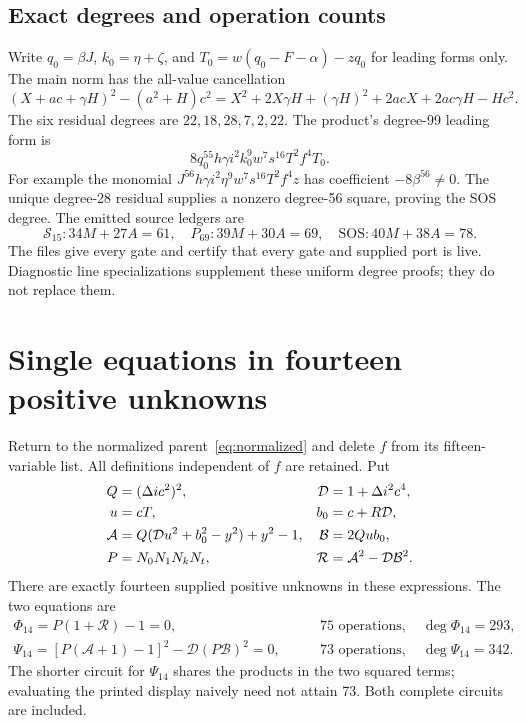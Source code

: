 \documentclass[11pt,a4paper]{article}
\theoremstyle{remark}\newtheorem{remark}[theorem]{Remark}
\newcommand{\RR}{\mathcal R}
\newcommand{\Arat}{\mathcal A}
\newcommand{\Brat}{\mathcal B}
\newcommand{\Drat}{\mathcal D}
\begin{document}
\subsection{Exact degrees and operation counts}
Write \(q_0=\beta J\), \(k_0=\eta+\zeta\), and
\(T_0=w(q_0-F-\alpha)-zq_0\) for leading forms only.
The main norm has the all-value cancellation
\[
 (X+ac+\gamma H)^2-(a^2+H)c^2
 =X^2+2X\gamma H+(\gamma H)^2+2acX+2ac\gamma H-Hc^2.
\]
The six residual degrees are \(22,18,28,7,2,22\).
The product's degree-99 leading form is
\begin{equation}
 8q_0^{55}h\gamma i^2k_0^9w^7s^{16}T^2f^4T_0.\label{eq:p69leader}
\end{equation}
For example the monomial
\(J^{56}h\gamma i^2\eta^9w^7s^{16}T^2f^4z\)
has coefficient \(-8\beta^{56}\ne0\). The unique degree-28
residual supplies a nonzero degree-56 square, proving the SOS degree.
The emitted source ledgers are
\[
 \mathcal S_{15}:34M+27A=61,\quad
 P_{69}:39M+30A=69,\quad
 \mathrm{SOS}:40M+38A=78.
\]
The files give every gate and certify that every gate and supplied port
is live. Diagnostic line specializations supplement these uniform
degree proofs; they do not replace them.

\section{Single equations in fourteen positive unknowns}\label{sec:root}
Return to the normalized parent~\eqref{eq:normalized} and delete \(f\)
from its fifteen-variable list. All definitions independent of \(f\)
are retained. Put
\begin{align}
 Q&=(\Delta ic^2)^2,&\Drat&=1+\Delta i^2c^4,\notag\\
 u&=cT,& b_0&=c+R\Drat,\notag\\
 \Arat&=Q(\Drat u^2+b_0^2-y^2)+y^2-1,&
 \Brat&=2Qub_0,\notag\\
 P&=N_0N_1N_kN_t,&\RR&=\Arat^2-\Drat\Brat^2.
 \label{eq:rootdata}
\end{align}
There are exactly fourteen supplied positive unknowns in these
expressions. The two equations are
\begin{align}
 \boxed{\Phi_{14}=P(1+\RR)-1=0},&
 \qquad 75\text{ operations},\quad\deg\Phi_{14}=293,
 \label{eq:phi}\\
 \boxed{\Psi_{14}=[P(\Arat+1)-1]^2-\Drat(P\Brat)^2=0},&
 \qquad 73\text{ operations},\quad\deg\Psi_{14}=342.
 \label{eq:psi}
\end{align}
The shorter circuit for \(\Psi_{14}\) shares the products in the two
squared terms; evaluating the printed display naively need not attain
73. Both complete circuits are included.
\end{document}
